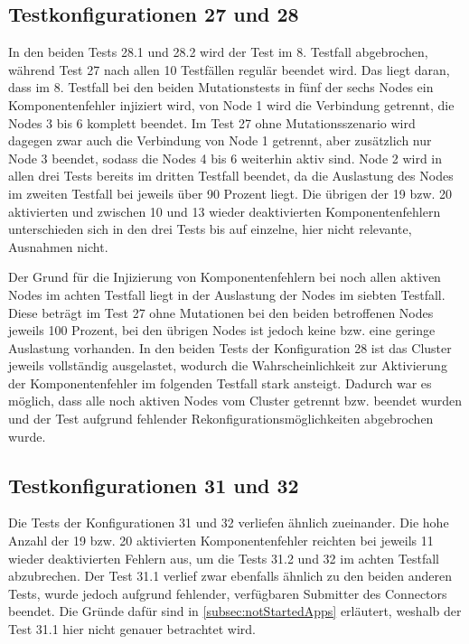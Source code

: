 \subsection{Testkonfigurationen 27 und 28}
\label{subsec:noReconf2728}

In den beiden Tests 28.1 und 28.2 wird der Test im 8. Testfall abgebrochen, während Test 27 nach allen 10 Testfällen regulär beendet wird.
Das liegt daran, dass im 8. Testfall bei den beiden Mutationstests in fünf der sechs Nodes ein Komponentenfehler injiziert wird, von Node 1 wird die Verbindung getrennt, die Nodes 3 bis 6 komplett beendet.
Im Test 27 ohne Mutationsszenario wird dagegen zwar auch die Verbindung von Node 1 getrennt, aber zusätzlich nur Node 3 beendet, sodass die Nodes 4 bis 6 weiterhin aktiv sind.
Node 2 wird in allen drei Tests bereits im dritten Testfall beendet, da die Auslastung des Nodes im zweiten Testfall bei jeweils über 90 Prozent liegt.
Die übrigen der 19 bzw. 20 aktivierten und zwischen 10 und 13 wieder deaktivierten Komponentenfehlern unterschieden sich in den drei Tests bis auf einzelne, hier nicht relevante, Ausnahmen nicht.

Der Grund für die Injizierung von Komponentenfehlern bei noch allen aktiven Nodes im achten Testfall liegt in der Auslastung der Nodes im siebten Testfall.
Diese beträgt im Test 27 ohne Mutationen bei den beiden betroffenen Nodes jeweils 100 Prozent, bei den übrigen Nodes ist jedoch keine bzw. eine geringe Auslastung vorhanden.
In den beiden Tests der Konfiguration 28 ist das Cluster jeweils vollständig ausgelastet, wodurch die Wahrscheinlichkeit zur Aktivierung der Komponentenfehler im folgenden Testfall stark ansteigt.
Dadurch war es möglich, dass alle noch aktiven Nodes vom Cluster getrennt bzw. beendet wurden und der Test aufgrund fehlender Rekonfigurationsmöglichkeiten abgebrochen wurde.

\subsection{Testkonfigurationen 31 und 32}
\label{subsec:noReconf3132}

Die Tests der Konfigurationen 31 und 32 verliefen ähnlich zueinander.
Die hohe Anzahl der 19 bzw. 20 aktivierten Komponentenfehler reichten bei jeweils 11 wieder deaktivierten Fehlern aus, um die Tests 31.2 und 32 im achten Testfall abzubrechen.
Der Test 31.1 verlief zwar ebenfalls ähnlich zu den beiden anderen Tests, wurde jedoch aufgrund fehlender, verfügbaren Submitter des Connectors beendet.
Die Gründe dafür sind in \cref{subsec:notStartedApps} erläutert, weshalb der Test 31.1 hier nicht genauer betrachtet wird.

